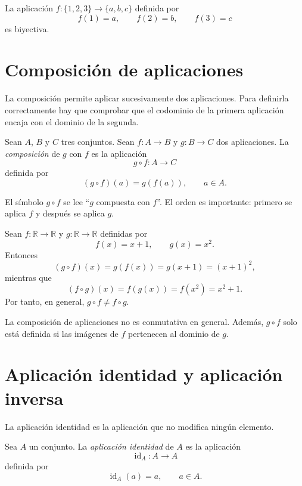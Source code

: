 \begin{ejemplo}
La aplicación \(f:\{1,2,3\}\to \{a,b,c\}\) definida por
\[
f(1)=a,\qquad f(2)=b,\qquad f(3)=c
\]
es biyectiva.
\end{ejemplo}

\section{Composición de aplicaciones}

La composición permite aplicar sucesivamente dos aplicaciones. Para definirla correctamente hay que comprobar que el codominio de la primera aplicación encaja con el dominio de la segunda.

\begin{definicion}[Composición]
Sean \(A\), \(B\) y \(C\) tres conjuntos. Sean \(f:A\to B\) y \(g:B\to C\) dos aplicaciones. La \emph{composición} de \(g\) con \(f\) es la aplicación
\[
g\circ f:A\to C
\]
definida por
\[
(g\circ f)(a)=g(f(a)),\qquad a\in A.
\]
\end{definicion}

El símbolo \(g\circ f\) se lee ``\(g\) compuesta con \(f\)''. El orden es importante: primero se aplica \(f\) y después se aplica \(g\).

\begin{ejemplo}
Sean \(f:\mathbb{R}\to\mathbb{R}\) y \(g:\mathbb{R}\to\mathbb{R}\) definidas por
\[
f(x)=x+1,\qquad g(x)=x^2.
\]
Entonces
\[
(g\circ f)(x)=g(f(x))=g(x+1)=(x+1)^2,
\]
mientras que
\[
(f\circ g)(x)=f(g(x))=f(x^2)=x^2+1.
\]
Por tanto, en general, \(g\circ f\ne f\circ g\).
\end{ejemplo}

\begin{advertencia}
La composición de aplicaciones no es conmutativa en general. Además, \(g\circ f\) solo está definida si las imágenes de \(f\) pertenecen al dominio de \(g\).
\end{advertencia}

\section{Aplicación identidad y aplicación inversa}

La aplicación identidad es la aplicación que no modifica ningún elemento.

\begin{definicion}
Sea \(A\) un conjunto. La \emph{aplicación identidad} de \(A\) es la aplicación
\[
\operatorname{id}_A:A\to A
\]
definida por
\[
\operatorname{id}_A(a)=a,\qquad a\in A.
\]
\end{definicion}

